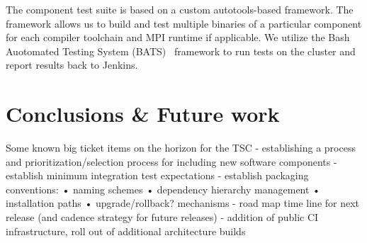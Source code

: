 \documentclass{sig-alternate-05-2015}
\begin{document}
The component test suite is based on a custom autotools-based framework. The
framework allows us to build and test multiple binaries of a particular
component for each compiler toolchain and MPI runtime if applicable.
We utilize the Bash Auotomated Testing System (BATS)~\cite{bats_url} 
framework to run tests on the cluster and report results back to Jenkins.


\section{Conclusions \& Future work}
Some known big ticket items on the horizon for the TSC
- establishing a process and prioritization/selection process for including
new software components
- establish minimum integration test expectations
- establish packaging conventions:
• naming schemes
• dependency hierarchy management • installation paths
• upgrade/rollback? mechanisms
- road map time line for next release (and cadence strategy for future releases)
- addition of public CI infrastructure, roll out of additional architecture builds




\end{document}
